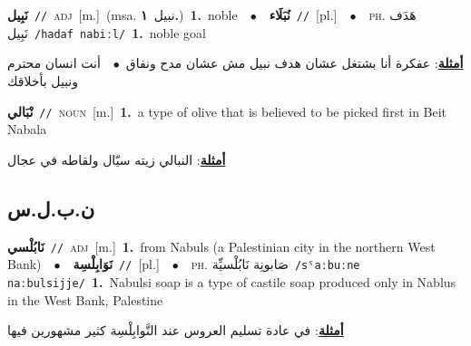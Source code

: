 \documentclass[10pt,a4paper,twoside]{article} %
\begin{document}
\begin{multicols}{2}
{{{{{{\setlength\topsep{0pt}\textbf{\foreignlanguage{arabic}{نَبِيل}}\ {\color{gray}\texttt{//}\color{black}}\ \textsc{adj}\ [m.]\ \color{gray}(msa. \foreignlanguage{arabic}{نبيل}~\foreignlanguage{arabic}{\textbf{١.}})\color{black}\ \textbf{1.}~noble\ \ $\bullet$\ \ \setlength\topsep{0pt}\textbf{\foreignlanguage{arabic}{نُبَلَاء}}\ {\color{gray}\texttt{//}\color{black}}\ [pl.]\ \ $\bullet$\ \ \textsc{ph.} \color{gray} \foreignlanguage{arabic}{هَدَف نَبِيل}\color{black}\ {\color{gray}\texttt{/{\sffamily hadaf nabiːl}/}\color{black}}\ \textbf{1.}~noble goal\  \begin{flushright}\color{gray}\foreignlanguage{arabic}{\textbf{\underline{\foreignlanguage{arabic}{أمثلة}}}: عفكرة أنا بشتغل عشان هدف نبيل مش عشان مدح ونفاق\ $\bullet$\ \  أنت انسان محترم ونبيل بأخلاقك}\end{flushright}\color{black}} \vspace{2mm}

{\setlength\topsep{0pt}\textbf{\foreignlanguage{arabic}{نْبَالي}}\ {\color{gray}\texttt{//}\color{black}}\ \textsc{noun}\ [m.]\ \textbf{1.}~a type of olive that is believed to be picked first in Beit Nabala\  \begin{flushright}\color{gray}\foreignlanguage{arabic}{\textbf{\underline{\foreignlanguage{arabic}{أمثلة}}}: النبالي زيته سيّال ولقاطه في عجال}\end{flushright}\color{black}} \vspace{2mm}

\vspace{-3mm}
\subsection*{\color{blue}\foreignlanguage{arabic}{ن.ب.ل.س}\color{blue}{}} 

{\setlength\topsep{0pt}\textbf{\foreignlanguage{arabic}{نَابُلْسي}}\ {\color{gray}\texttt{//}\color{black}}\ \textsc{adj}\ [m.]\ \textbf{1.}~from Nabuls (a Palestinian city in the northern West Bank)\ \ $\bullet$\ \ \setlength\topsep{0pt}\textbf{\foreignlanguage{arabic}{نَوَابِلْسِة}}\ {\color{gray}\texttt{//}\color{black}}\ [pl.]\ \ $\bullet$\ \ \textsc{ph.} \color{gray} \foreignlanguage{arabic}{صَابونِة نَابُلْسيِّة}\color{black}\ {\color{gray}\texttt{/{\sffamily sˤaːbuːne naːbulsijje}/}\color{black}}\ \textbf{1.}~Nabulsi soap is a type of castile soap produced only in Nablus in the West Bank, Palestine\  \begin{flushright}\color{gray}\foreignlanguage{arabic}{\textbf{\underline{\foreignlanguage{arabic}{أمثلة}}}: في عادة تسليم العروس عند النَّوابِلْسِة كثير مشهورين فيها}\end{flushright}\color{black}} \vspace{2mm}

}}}}}
\end{multicols}
\end{document}
